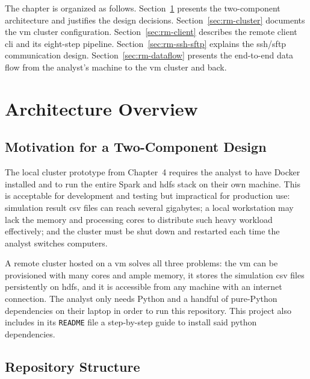 The chapter is organized as follows.
Section~\ref{sec:rm-overview} presents the two-component architecture and justifies the
design decisions.
Section~\ref{sec:rm-cluster} documents the \gls{vm} cluster configuration.
Section~\ref{sec:rm-client} describes the remote client \gls{cli} and its eight-step pipeline.
Section~\ref{sec:rm-ssh-sftp} explains the \gls{ssh}/\gls{sftp} communication design.
Section~\ref{sec:rm-dataflow} presents the end-to-end data flow from the analyst's machine to
the \gls{vm} cluster and back.

\section{Architecture Overview}
\label{sec:rm-overview}

\subsection{Motivation for a Two-Component Design}
\label{subsec:rm-motivation-two-component}

The local cluster prototype from Chapter~4 requires the analyst to have Docker installed and to
run the entire Spark and \gls{hdfs} stack on their own machine.  This is acceptable for
development and testing but impractical for production use: simulation result \gls{csv} files
can reach several gigabytes; a local workstation may lack the memory and processing cores to
distribute such heavy workload effectively; and the cluster must be shut down and restarted
each time the analyst switches computers.

A remote cluster hosted on a \gls{vm} solves all three problems: the \gls{vm} can be provisioned
with many cores and ample memory, it stores the simulation \gls{csv} files persistently on
\gls{hdfs}, and it is accessible from any machine with an internet connection.  The analyst only
needs Python and a handful of pure-Python dependencies on their laptop in order to run this
repository. This project also includes in its \texttt{README} file a step-by-step guide to
install said python dependencies.

\subsection{Repository Structure}
\label{subsec:rm-repository-structure}

